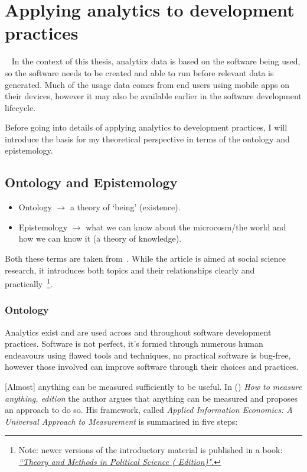 \chapter{Applying analytics to development practices}~\label{chapter-applying-analytics-to-development-practices}
In the context of this thesis, analytics data is based on the software being used, so the software needs to be created and able to run before relevant data is generated. Much of the usage data comes from end users using mobile apps on their devices, however it may also be available earlier in the software development lifecycle.

Before going into details of applying analytics to development practices, I will introduce the basis for my theoretical perspective in terms of the ontology and epistemology.

\section{Ontology and Epistemology}
\begin{itemize}
    \item Ontology \( \rightarrow \) a theory of `being' (existence).
    \item Epistemology \( \rightarrow \) what we can know about the microcosm/the world and how we can know it (a theory of knowledge).
\end{itemize}

Both these terms are taken from~\cite{marsh2002skin}. While the article is aimed at social science research, it introduces both topics and their relationships clearly and practically~\footnote{Note: newer versions of the introductory material is published in a book: \href{https://www.macmillanihe.com/page/detail/Theory-and-Methods-in-Political-Science/?K=9781137603517}{\emph{``Theory and Methods in Political Science ( Edition)".}}}.

\subsection{Ontology}
Analytics exist and are used across and throughout software development practices. Software is not perfect, it's formed through numerous human endeavours using flawed tools and techniques, no practical software is bug-free, however those involved can improve software through their choices and practices.

[Almost] anything can be measured sufficiently to be useful. In (\cite{hubbard2014measure}) \emph{How to measure anything,  edition} the author argues that anything can be measured and proposes an approach to do so. His framework, called \emph{Applied Information Economics: A Universal Approach to Measurement} is summarised in five steps:

